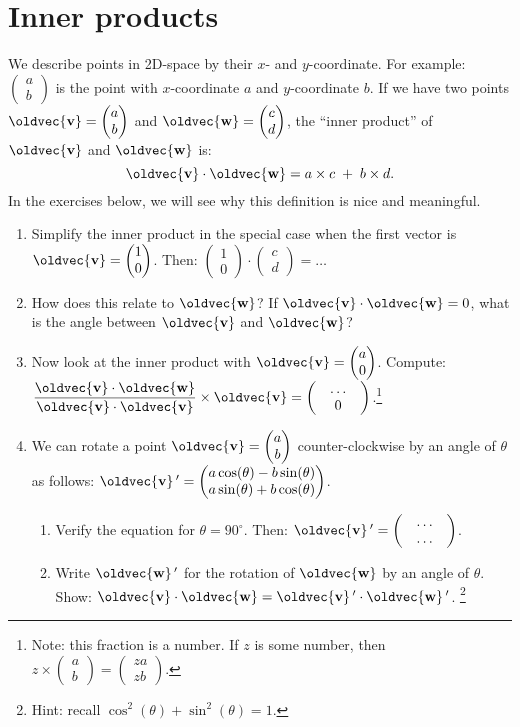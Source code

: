 \documentclass[10pt,a4paper]{article}
\newcommand{\twovec}[2]{\ensuremath{\begin{pmatrix}{#1}\\{#2}\end{pmatrix}}}
\renewcommand{\vec}[1]{\oldvec{\mathbf{#1}}}
\begin{document}
\section{Inner products}
We describe points in 2D-space by their \(x\)- and \(y\)-coordinate.
For example: \(\twovec{a}{b}\) is the point with \(x\)-coordinate \(a\) and \(y\)-coordinate \(b\).
If we have two points \(\vec{v} = \twovec{a}{b}\) and \(\vec{w} = \twovec{c}{d}\),
	the ``inner product'' of \(\vec{v}\) and \(\vec{w}\) is:
\[\vec{v} \cdot \vec{w} = a \times c \;+\; b \times d.\]
In the exercises below, we will see why this definition is nice and meaningful.

\begin{enumerate}
\item Simplify the inner product in the special case when the first vector is \( \vec{v} = \twovec{1}{0}\).
	Then: \(\twovec{1}{0} \cdot \twovec{c}{d} = \ldots\)
	\begin{figure}[h!]
		\centering{}
	\end{figure}

\item How does this relate to \(\vec{w}\)? If \(\vec{v} \cdot \vec{w} = 0\), what is the angle between \(\vec{v}\) and \(\vec{w}\)?

\item\label{item:proj} Now look at the inner product with \( \vec{v} = \twovec{a}{0}\).
	Compute: \(\displaystyle\frac{\vec{v} \cdot \vec{w}}{\vec{v} \cdot \vec{v}} \times \vec{v} = \twovec{\quad\ldots\quad}{0}\).\footnote{Note: this fraction is a number. If \(z\) is some number, then \(z \times \twovec{a}{b} = \twovec{za}{zb}\).}

\item We can rotate a point \(\vec{v} = \twovec{a}{b}\) counter-clockwise by an angle of \(\theta\)
	as follows: \(\vec{v}\,' = \twovec{a \cos(\theta) - b \sin(\theta)}{a \sin(\theta) + b \cos(\theta)}\).\\[-1em]
	\begin{enumerate}
	\item Verify the equation for \(\theta = 90^\circ\).
		Then: \(\vec{v}\,' = \twovec{\quad\ldots\quad}{\quad\ldots\quad}\).

	\item Write \(\vec{w}\,'\) for the rotation of \(\vec{w}\) by an angle of \(\theta\).
		Show: \(\vec{v} \cdot \vec{w} = \vec{v}\,' \cdot \vec{w}\,'\).%
		\footnote{Hint: recall \(\cos^2(\theta) + \sin^2(\theta) = 1\).}
	\end{enumerate}


\end{enumerate}
\end{document}
